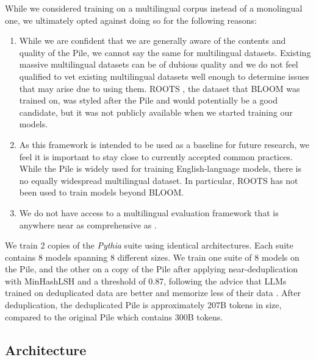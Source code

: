 \documentclass{article}
\theoremstyle{plain}
\theoremstyle{definition}
\theoremstyle{remark}
\begin{document}
While we considered training on a multilingual corpus instead of a monolingual one, we ultimately opted against doing so for the following reasons:
\begin{enumerate}
    \item While we are confident that we are generally aware of the contents and quality of the Pile, we cannot say the same for multilingual datasets. Existing massive multilingual datasets can be of dubious quality \citep{caswell2020language,kreutzer2021quality} and we do not feel qualified to vet existing multilingual datasets well enough to determine issues that may arise due to using them. ROOTS \cite{laurencon2022roots}, the dataset that BLOOM \citep{scao2022bloom} was trained on, was styled after the Pile and would potentially be a good candidate, but it was not publicly available when we started training our models.
    \item As this framework is intended to be used as a baseline for future research, we feel it is important to stay close to currently accepted common practices. While the Pile is widely used for training English-language models, there is no equally widespread multilingual dataset. In particular, ROOTS has not been used to train models beyond BLOOM. 
    \item We do not have access to a multilingual evaluation framework that is anywhere near as comprehensive as \citet{gao2021eval}.
\end{enumerate}

We train 2 copies of the \textit{Pythia} suite using identical architectures. Each suite contains 8 models spanning 8 different sizes. We train one suite of 8 models on the Pile, and the other on a copy of the Pile after applying near-deduplication with MinHashLSH and a threshold of 0.87, following the advice that LLMs trained on deduplicated data are better and memorize less of their data
\citep{Lee2021DeduplicatingTD}. After deduplication, the deduplicated Pile is approximately 207B tokens in size, compared to the original Pile which contains 300B tokens.

\subsection{Architecture}
\end{document}
